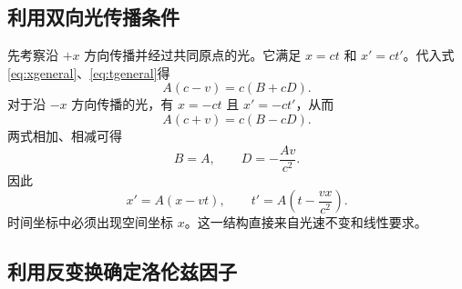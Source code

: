 \documentclass[style=classic,color=full]{lc-article}
\begin{document}
\subsection{利用双向光传播条件}

先考察沿 $+x$ 方向传播并经过共同原点的光。它满足 $x=ct$ 和 $x'=ct'$。代入式\eqref{eq:xgeneral}、\eqref{eq:tgeneral}得
\begin{equation}
  A(c-v)=c(B+cD).
  \label{eq:lightplus}
\end{equation}
对于沿 $-x$ 方向传播的光，有 $x=-ct$ 且 $x'=-ct'$，从而
\begin{equation}
  A(c+v)=c(B-cD).
  \label{eq:lightminus}
\end{equation}
两式相加、相减可得
\begin{equation}
  B=A,\qquad D=-\frac{Av}{c^2}.
\end{equation}
因此
\begin{equation}
  x'=A(x-vt),\qquad
  t'=A\left(t-\frac{vx}{c^2}\right).
  \label{eq:lorentzA}
\end{equation}
时间坐标中必须出现空间坐标 $x$。这一结构直接来自光速不变和线性要求。

\subsection{利用反变换确定洛伦兹因子}
\end{document}
